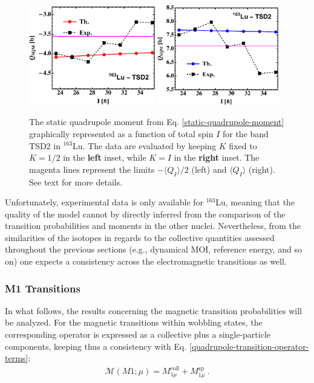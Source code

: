 \begin{figure}
    \centering
    \includegraphics[width=0.49\textwidth]{Chapters/Figures/Q_SQM_163Lu-3.pdf}
    \includegraphics[width=0.47\textwidth]{Chapters/Figures/Q_SQM_163Lu-4.pdf}
    \caption{The static quadrupole moment from Eq. \ref{static-quadrupole-moment} graphically represented as a function of total spin $I$ for the band TSD2 in $^{163}$Lu. The data are evaluated by keeping $K$ fixed to $K=1/2$ in the \textbf{left} inset, while $K=I$ in the \textbf{right} inset. The magenta lines represent the limits $-\langle Q_I\rangle/2$ (left) and $\langle Q_I\rangle$ (right). See text for more details.}
    \label{static-quadrupole-fixed-K-TSD2}
\end{figure}

Unfortunately, experimental data is only available for $^{163}$Lu, meaning that the quality of the model cannot by directly inferred from the comparison of the transition probabilities and moments in the other nuclei. Nevertheless, from the similarities of the isotopes in regards to the collective quantities assessed throughout the previous sections (e.g., dynamical MOI, reference energy, and so on) one expects a consistency across the electromagnetic transitions as well.

\subsubsection{M1 Transitions}

In what follows, the results concerning the magnetic transition probabilities will be analyzed. For the magnetic transitions within wobbling states, the corresponding operator is expressed as a collective plus a single-particle components, keeping thus a consistency with Eq. \ref{quadrupole-transition-operator-terms}:
\begin{align}
    \mathcal{M}(M1;\mu)=M_{1\mu}^\text{coll}+M_{1\mu}^\text{sp}\ .
    \label{dipole-transition-operator-terms}
\end{align}

